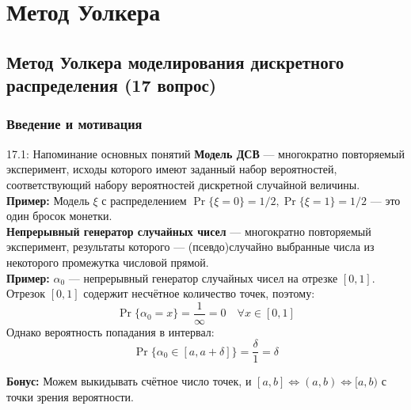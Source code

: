 \documentclass[a4paper,12pt]{article}
\begin{document}
	
	
	
	
	
	\newpage
	\section{Метод Уолкера}
	
	\subsection{Метод Уолкера моделирования дискретного распределения (17 вопрос)}
	
	\subsubsection{Введение и мотивация}
	
	\begin{definitionbox}{17.1: Напоминание основных понятий}
		\textbf{Модель ДСВ} — многократно повторяемый эксперимент, исходы которого имеют заданный набор вероятностей, соответствующий набору вероятностей дискретной случайной величины. \\
		
		\textbf{Пример:} Модель \(\xi\) с распределением \(\Pr\{\xi = 0\} = 1/2, \Pr\{\xi = 1\} = 1/2\) — это один бросок монетки.\\
		
		\textbf{Непрерывный генератор случайных чисел} — многократно повторяемый эксперимент, результаты которого — (псевдо)случайно выбранные числа из некоторого промежутка числовой прямой.\\
		
		\textbf{Пример:} \(\alpha_0\) — непрерывный генератор случайных чисел на отрезке \([0, 1]\). Отрезок \([0, 1]\) содержит несчётное количество точек, поэтому:
		\[ \Pr\{\alpha_0 = x\} = \frac{1}{\infty} = 0 \quad \forall x \in [0, 1] \]
		Однако вероятность попадания в интервал:
		\[ \Pr\{\alpha_0 \in [a, a+\delta]\} = \frac{\delta}{1} = \delta \]
		
		\textbf{Бонус:} Можем выкидывать счётное число точек, и \([a, b] \iff (a, b) \iff [a, b)\) с точки зрения вероятности.
	\end{definitionbox}
	
\end{document}
